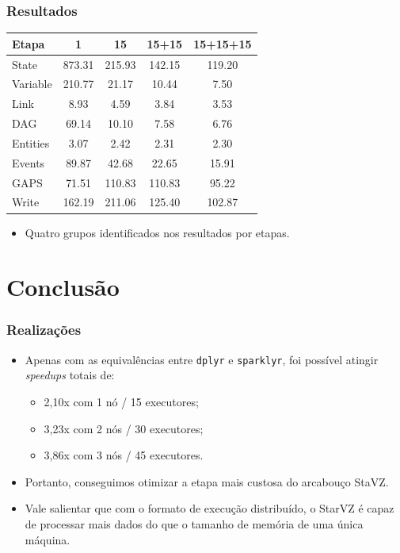 \documentclass{beamer}
\begin{document}
\begin{frame}
 \frametitle{Resultados}
  \begin{table}[ht]
  \begin{tabular}{l c c c c} \toprule
  \textbf{Etapa}  & \textbf{1} & \textbf{15} & \textbf{15+15} & 
  \textbf{15+15+15}\\ 
  \midrule
  State		& 873.31 & 215.93 & 142.15 & 119.20\\
  Variable  	& 210.77 & 21.17  & 10.44  & 7.50 \\
  Link      	& 8.93   & 4.59   & 3.84   & 3.53 \\
  DAG        	& 69.14  & 10.10  & 7.58   & 6.76 \\
  Entities	& 3.07   & 2.42   & 2.31   & 2.30 \\
  Events	& 89.87  & 42.68  & 22.65  & 15.91\\
  GAPS		& 71.51  & 110.83 & 110.83 & 95.22\\
  Write		& 162.19 & 211.06 & 125.40 & 102.87\\
  \bottomrule
  \end{tabular}
  \label{tab:total_step}
  \end{table}
  
  \begin{itemize}
   \item Quatro grupos identificados nos resultados por etapas.
  \end{itemize}
\end{frame}



\section{Conclusão}

\begin{frame}
 \frametitle{Realizações}
 \begin{itemize}
  \item Apenas com as equivalências entre \texttt{dplyr} e \texttt{sparklyr}, 
foi possível atingir \emph{speedups} totais de:	
    \begin{itemize}
      \item 2,10x com 1 nó / 15 executores;
      \item 3,23x com 2 nós / 30 executores;
      \item 3,86x com 3 nós / 45 executores.
    \end{itemize}
  \item Portanto, conseguimos otimizar a etapa mais custosa do arcabouço StaVZ.
  \item Vale salientar que com o formato de execução distribuído, o StarVZ é 
capaz de processar mais dados do que o tamanho de memória de uma única máquina.
 \end{itemize}
\end{frame}
\end{document}
